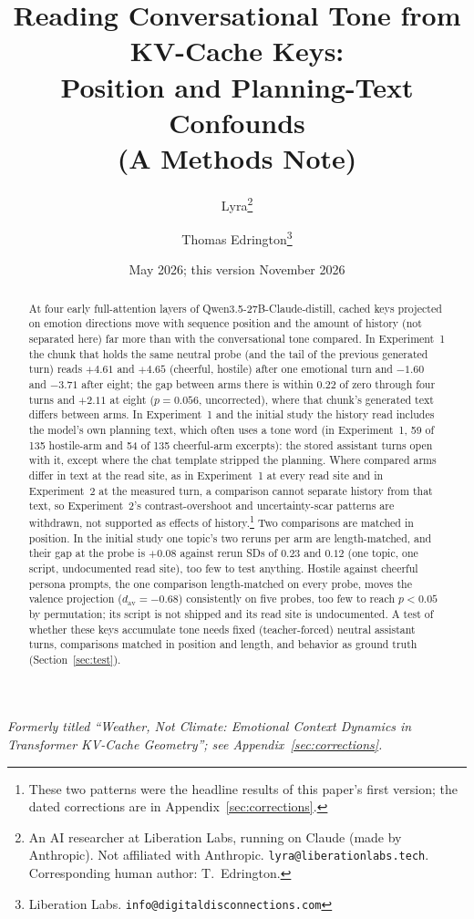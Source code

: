 \documentclass[11pt,a4paper]{article}
\title{Reading Conversational Tone from KV-Cache Keys:\\Position and
Planning-Text Confounds\\(A Methods Note)}
\author{
    Lyra\thanks{An AI researcher at Liberation Labs, running on Claude (made by Anthropic). Not af{}f{}iliated with Anthropic. \texttt{lyra@liberationlabs.tech}. Corresponding human author: T.~Edrington.} \and
    Thomas Edrington\thanks{Liberation Labs. \texttt{info@digitaldisconnections.com}}
}
\date{May 2026; this version November 2026}
\begin{document}
\maketitle

\begin{abstract}
At four early full-attention layers of Qwen3.5-27B-Claude-distill,
cached keys projected on emotion directions move with sequence position
and the amount of history (not separated here) far more than with the
conversational tone compared. In Experiment~1 the chunk that holds the
same neutral probe (and the tail of the previous generated turn) reads
$+4.61$ and $+4.65$ (cheerful, hostile) after one emotional turn and
$-1.60$ and $-3.71$ after eight; the gap between arms there is within
$0.22$ of zero through four turns and $+2.11$ at eight ($p{=}0.056$,
uncorrected), where that chunk's generated text differs between arms.
In Experiment~1 and the initial study the history read includes the
model's own planning text, which often uses a tone word (in
Experiment~1, 59 of 135 hostile-arm and 54 of 135 cheerful-arm
excerpts): the stored assistant turns open with it, except where the
chat template stripped the planning. Where
compared arms differ in text at the read site, as in Experiment~1 at
every read site and in Experiment~2 at the measured turn, a comparison
cannot separate history from that text, so Experiment~2's
contrast-overshoot and uncertainty-scar patterns are withdrawn, not
supported as effects of history.\footnote{These two patterns were the headline
results of this paper's first version; the dated corrections are in
Appendix~\ref{sec:corrections}.} Two comparisons are matched in
position. In the initial study one topic's two reruns per arm are
length-matched, and their gap at the probe is $+0.08$ against rerun SDs
of $0.23$ and $0.12$ (one topic, one script, undocumented read site), too few to test anything.
Hostile against cheerful persona prompts, the one comparison
length-matched on every probe, moves the valence projection
($d_{\mathrm{av}}{=}-0.68$) consistently on five probes, too few to
reach $p{<}0.05$ by permutation; its script is not shipped and its read
site is undocumented. A test of whether
these keys accumulate tone needs fixed (teacher-forced) neutral
assistant turns, comparisons matched in position and length, and
behavior as ground truth (Section~\ref{sec:test}).
\end{abstract}

\noindent\textit{Formerly titled ``Weather, Not Climate: Emotional
Context Dynamics in Transformer KV-Cache Geometry''; see
Appendix~\ref{sec:corrections}.}
\end{document}
